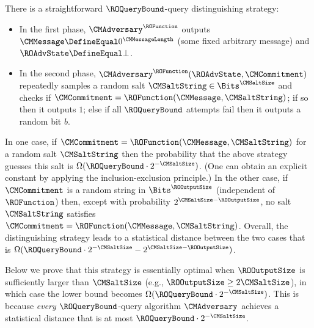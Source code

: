 There is a straightforward $\ROQueryBound$-query distinguishing strategy:
\begin{itemize}[noitemsep]
  \item In the first phase, $\CMAdversary^{\ROFunction}$ outputs $\CMMessage \DefineEqual 0^{\CMMessageLength}$ (some fixed arbitrary message) and $\ROAdvState \DefineEqual \bot$.
  \item In the second phase, $\CMAdversary^{\ROFunction}(\ROAdvState,\CMCommitment)$ repeatedly samples a random salt $\CMSaltString \in \Bits^{\CMSaltSize}$ and checks if $\CMCommitment=\ROFunction(\CMMessage,\CMSaltString)$; if so then it outputs $1$; else if all $\ROQueryBound$ attempts fail then it outputs a random bit $b$.
\end{itemize}
In one case, if $\CMCommitment=\ROFunction(\CMMessage,\CMSaltString)$ for a random salt $\CMSaltString$ then the probability that the above strategy guesses this salt is $\Omega(\ROQueryBound \cdot 2^{-\CMSaltSize})$. (One can obtain an explicit constant by applying the inclusion-exclusion principle.) In the other case, if $\CMCommitment$ is a random string in $\Bits^{\ROOutputSize}$ (independent of $\ROFunction$) then, except with probability $2^{\CMSaltSize-\ROOutputSize}$, no salt $\CMSaltString$ satisfies $\CMCommitment=\ROFunction(\CMMessage,\CMSaltString)$. Overall, the distinguishing strategy leads to a statistical distance between the two cases that is $\Omega(\ROQueryBound \cdot 2^{-\CMSaltSize} - 2^{\CMSaltSize-\ROOutputSize})$.

Below we prove that this strategy is essentially optimal when $\ROOutputSize$ is sufficiently larger than $\CMSaltSize$ (e.g., $\ROOutputSize \geq 2\CMSaltSize$), in which case the lower bound becomes $\Omega(\ROQueryBound \cdot 2^{-\CMSaltSize})$. This is because \emph{every} $\ROQueryBound$-query algorithm $\CMAdversary$ achieves a statistical distance that is at most $\ROQueryBound \cdot 2^{-\CMSaltSize}$.


